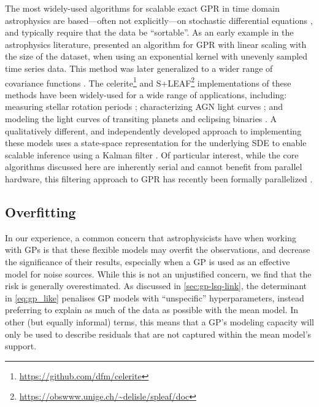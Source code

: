 \documentclass[letterpaper]{ar-1col}
\newcommand{\suz}[1]{\textcolor{magenta}{#1}}
\newcommand{\dan}[1]{\textcolor{green}{#1}}
\newcommand{\project}[1]{\textsf{#1}}
\begin{document}
The most widely-used algorithms for scalable exact GPR in time domain astrophysics are based---often not explicitly---on stochastic differential equations \citep[SDEs;][]{Sarkka:2019}, and typically require that the data be ``sortable''.
As an early example in the astrophysics literature, \citet{pr95} presented an algorithm for GPR with linear scaling with the size of the dataset, when using an exponential kernel with unevenly sampled time series data.
This method was later generalized to a wider range of covariance functions \citep{ambikasaran2015generalized, celerite, 2020AJ....160..240G, 2020A&A...638A..95D, 2022A&A...659A.182D}.
The \project{celerite}\footnote{\url{https://github.com/dfm/celerite}} and \project{S+LEAF}\footnote{\url{https://obswww.unige.ch/~delisle/spleaf/doc}} implementations of these methods have been widely-used for a wide range of applications, including: measuring stellar rotation periods \citep[e.g.,][]{2020MNRAS.492.1008G, 2022AJ....164..115N}; characterizing AGN light curves \citep[e.g.,][]{2022ApJ...936..132Y}; and modeling the light curves of transiting planets \citep[e.g.,][]{2019AJ....158...32K} and eclipsing binaries \citep[e.g.,][]{2020ApJS..250...34C}.
A qualitatively different, and independently developed approach to implementing these models uses a state-space representation for the underlying SDE to enable scalable inference using a Kalman filter \citep{2014ApJ...788...33K,  2021RNAAS...5..107J, 2022arXiv220709327M}.
Of particular interest, while the core algorithms discussed here are inherently serial and cannot benefit from parallel hardware, this filtering approach to GPR has recently been formally parallelized \citep{sarkka2020temporal}.



\subsection{Overfitting}

In our experience, a common concern that astrophysicists have when working with GPs is that these flexible models may overfit the observations, and decrease the significance of their results, especially when a GP is used as an effective model for noise sources.
While this is not an unjustified concern, we find that the risk is generally overestimated.
As discussed in \autoref{sec:gp-lsq-link}, the determinant in \autoref{eq:gp_like} penalises GP models with ``unspecific'' hyperparameters, instead preferring to explain as much of the data as possible with the mean model.
In other (but equally informal) terms, this means that a GP's modeling capacity will only be used to describe residuals that are not captured within the mean model's support.
\end{document}
